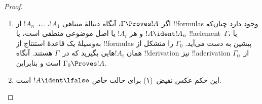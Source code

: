 \documentclass[../../../include/open-logic-section]{subfiles}
\begin{document}
\begin{proof}
  \begin{enumerate}
    \item اگر $\Gamma \Proves !A$، آنگاه دنبالهٔ متناهی
      $!A_1$، \dots،~$!A_n$ از !!{formula}s وجود دارد چنان‌که
      $!A \ident !A_n$ و هر $!A_i$ یا اصل موضوعی منطقی است، یا
      !!a{element}~$\Gamma$، یا به‌وسیلهٔ یک قاعدهٔ استنتاج از
      !!{formula}s پیشین به دست می‌آید. $\Gamma_0$ را متشکل از همان
      $!A_i$هایی بگیرید که در~$\Gamma$ هستند. آنگاه !!{derivation} نیز
      !!a{derivation} از~$\Gamma_0$ است و بنابراین
      $\Gamma_0 \Proves !A$.
    \item این حکم عکس نقیض~(۱) برای حالت خاص
      $!A \ident \lfalse$ است.
\end{enumerate}
\end{proof}
\end{document}
